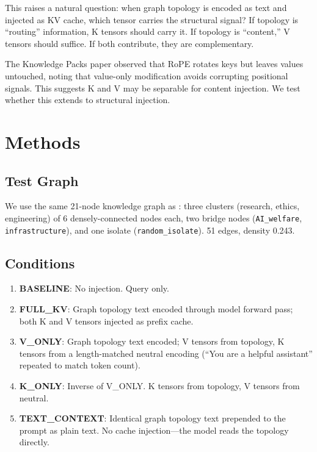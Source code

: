 \documentclass[11pt,a4paper]{article}
\begin{document}
This raises a natural question: when graph topology is encoded as text and injected as KV cache, which tensor carries the structural signal? If topology is ``routing'' information, K tensors should carry it. If topology is ``content,'' V tensors should suffice. If both contribute, they are complementary.

The Knowledge Packs paper \citep{pustovit2026knowledge} observed that RoPE rotates keys but leaves values untouched, noting that value-only modification avoids corrupting positional signals. This suggests K and V may be separable for content injection. We test whether this extends to structural injection.

\section{Methods}

\subsection{Test Graph}

We use the same 21-node knowledge graph as \citet{nexus2026topology}: three clusters (research, ethics, engineering) of 6 densely-connected nodes each, two bridge nodes (\texttt{AI\_welfare}, \texttt{infrastructure}), and one isolate (\texttt{random\_isolate}). 51 edges, density 0.243.

\subsection{Conditions}

\begin{enumerate}
    \item \textbf{BASELINE}: No injection. Query only.
    \item \textbf{FULL\_KV}: Graph topology text encoded through model forward pass; both K and V tensors injected as prefix cache.
    \item \textbf{V\_ONLY}: Graph topology text encoded; V tensors from topology, K tensors from a length-matched neutral encoding (``You are a helpful assistant'' repeated to match token count).
    \item \textbf{K\_ONLY}: Inverse of V\_ONLY. K tensors from topology, V tensors from neutral.
    \item \textbf{TEXT\_CONTEXT}: Identical graph topology text prepended to the prompt as plain text. No cache injection---the model reads the topology directly.
\end{enumerate}
\end{document}
